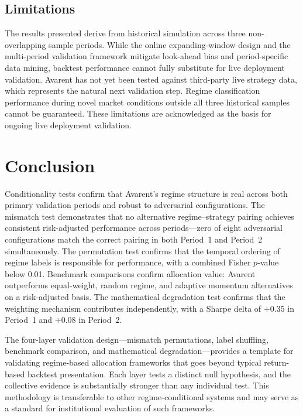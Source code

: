 \documentclass[12pt]{article}
\begin{document}
\subsection{Limitations}

The results presented derive from historical simulation across three non-overlapping sample periods.
While the online expanding-window design and the multi-period validation framework mitigate look-ahead bias and period-specific data mining, backtest performance cannot fully substitute for live deployment validation.
Avarent has not yet been tested against third-party live strategy data, which represents the natural next validation step.
Regime classification performance during novel market conditions outside all three historical samples cannot be guaranteed.
These limitations are acknowledged as the basis for ongoing live deployment validation.

\section{Conclusion}

Conditionality tests confirm that Avarent's regime structure is real across both primary validation periods and robust to adversarial configurations.
The mismatch test demonstrates that no alternative regime--strategy pairing achieves consistent risk-adjusted performance across periods---zero of eight adversarial configurations match the correct pairing in both Period~1 and Period~2 simultaneously.
The permutation test confirms that the temporal ordering of regime labels is responsible for performance, with a combined Fisher $p$-value below 0.01.
Benchmark comparisons confirm allocation value: Avarent outperforms equal-weight, random regime, and adaptive momentum alternatives on a risk-adjusted basis.
The mathematical degradation test confirms that the weighting mechanism contributes independently, with a Sharpe delta of $+0.35$ in Period~1 and $+0.08$ in Period~2.

The four-layer validation design---mismatch permutations, label shuffling, benchmark comparison, and mathematical degradation---provides a template for validating regime-based allocation frameworks that goes beyond typical return-based backtest presentation.
Each layer tests a distinct null hypothesis, and the collective evidence is substantially stronger than any individual test.
This methodology is transferable to other regime-conditional systems and may serve as a standard for institutional evaluation of such frameworks.
\end{document}
